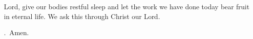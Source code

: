 \lettrine[loversize=0.15,lines=2]{L}{}ord,
give our bodies restful sleep
and let the work we have done today
bear fruit in eternal life.
We ask this through Christ our Lord.
\par \Rbar.~Amen.
